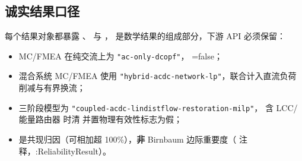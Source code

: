 \subsection{诚实结果口径}
每个结果对象都暴露 、 与 ，
是数学结果的组成部分，下游 API 必须保留：
\begin{itemize}
  \item MC/FMEA 在纯交流上为 \texttt{"ac-only-dcopf"}，
        =false；
  \item 混合系统 MC/FMEA 使用 \texttt{"hybrid-acdc-network-lp"}，联合计入直流负荷削减与有界换流；
  \item 三阶段模型为
        \texttt{"coupled-acdc-\allowbreak lindistflow-\allowbreak restoration-milp"}，
        含 LCC/能量路由器
        时清  并置物理有效性标志为假；
  \item {} 是共现归因（可相加超 100\%），\textbf{非} Birnbaum
        边际重要度（  注释，:ReliabilityResult）。
\end{itemize}
